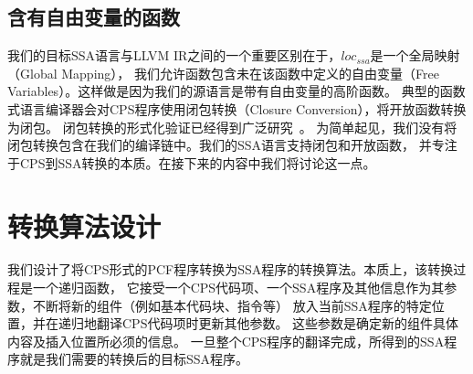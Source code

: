 \subsection{含有自由变量的函数}

我们的目标SSA语言与LLVM IR之间的一个重要区别在于，$loc_{ssa}$是一个全局映射（Global Mapping），
我们允许函数包含未在该函数中定义的自由变量（Free Variables）。这样做是因为我们的源语言是带有自由变量的高阶函数。
典型的函数式语言编译器会对CPS程序使用闭包转换（Closure Conversion），将开放函数转换为闭包。
闭包转换的形式化验证已经得到广泛研究~\cite{paraskevopoulou2019closure,wang-esop2016}。
为简单起见，我们没有将闭包转换包含在我们的编译链中。我们的SSA语言支持闭包和开放函数，
并专注于CPS到SSA转换的本质。在接下来的内容中我们将讨论这一点。

\section{转换算法设计} \label{sec:cpsssatrans}

我们设计了将CPS形式的PCF程序转换为SSA程序的转换算法。本质上，该转换过程是一个递归函数，
它接受一个CPS代码项、一个SSA程序及其他信息作为其参数，不断将新的组件（例如基本代码块、指令等）
放入当前SSA程序的特定位置，并在递归地翻译CPS代码项时更新其他参数。
这些参数是确定新的组件具体内容及插入位置所必须的信息。
一旦整个CPS程序的翻译完成，所得到的SSA程序就是我们需要的转换后的目标SSA程序。


